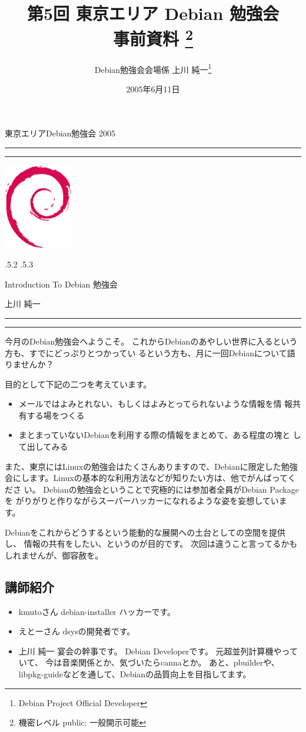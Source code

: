 \documentclass[mingoth]{jsarticle}
\makeatletter
\renewcommand{\section}{\@startsection{section}{1}{\z@}%
    {\Cvs \@plus.5\Cdp \@minus.2\Cdp}%
    {.5\Cvs \@plus.3\Cdp}%
    {\normalfont\Large\headfont\raggedright\centering}} %
\newcommand{\dancersection}[2]{%
\newpage
東京エリアDebian勉強会 2005
\hrule
\vspace{0.5mm}
\hrule
\hfill{}\includegraphics[width=3cm]{image200502/openlogo-nd.eps}\\
\vspace{-4cm}
\begin{center}
  \section{#1}
\end{center}
\hfill{}#2\hspace{3cm}\space\\
\hrule
\hrule
\vspace{1cm}
}
\makeatother
\begin{document}
\begin{titlepage}

\title{
 第5回 東京エリア Debian 勉強会\\事前資料
\footnote{機密レベル public: 一般開示可能}}
\date{2005年6月11日}
\author{Debian勉強会会場係 上川 純一\thanks{Debian Project Official Developer}} 
\maketitle

\end{titlepage}

\newpage
\tableofcontents

\dancersection{Introduction To Debian 勉強会}{上川 純一}

今月のDebian勉強会へようこそ。
これからDebianのあやしい世界に入るという方も、すでにどっぷりとつかってい
るという方も、月に一回Debianについて語りませんか？

目的として下記の二つを考えています。

\begin{itemize}
 \item メールではよみとれない、もしくはよみとってられないような情報を情
       報共有する場をつくる
 \item まとまっていないDebianを利用する際の情報をまとめて、ある程度の塊と
       して出してみる
\end{itemize}

また、東京にはLinuxの勉強会はたくさんありますので、Debianに限定した勉強
会にします。Linuxの基本的な利用方法などが知りたい方は、他でがんばってくださ
い。
Debianの勉強会ということで究極的には参加者全員がDebian Packageを
がりがりと作りながらスーパーハッカーになれるような姿を妄想しています。

Debianをこれからどうするという能動的な展開への土台としての空間を提供し、
情報の共有をしたい、というのが目的です。
次回は違うこと言ってるかもしれませんが、御容赦を。

\subsection{講師紹介}

\begin{itemize}
 \item{kmutoさん} debian-installer ハッカーです。
 \item{えとーさん} dsysの開発者です。
 \item{上川 純一} 宴会の幹事です。
      Debian Developerです。
      元超並列計算機やっていて、
      今は音楽関係とか、気づいたらcannaとか。
      あと、pbuilderや、libpkg-guideなどを通して、Debianの品質向上を目指してます。
\end{itemize}
\end{document}
